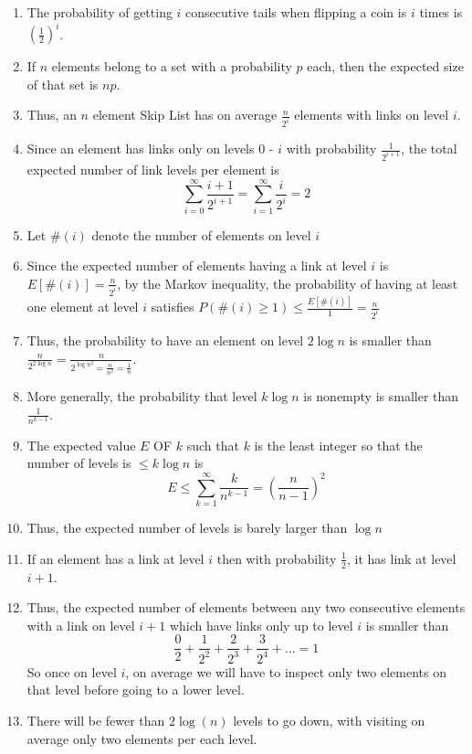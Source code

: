 \documentclass[12pt, letterpaper]{article}
\begin{document}
\begin{enumerate}
    \item The probability of getting $i$ consecutive tails when flipping a coin is $i$ times is $(\frac{1}{2})^i$.
    \item If $n$ elements belong to a set with a probability $p$ each, then the expected size of that set is $np$.
    \item Thus, an $n$ element Skip List has on average $\frac{n}{2^i}$ elements with links on level $i$.
    \item Since an element has links only on levels 0 - $i$ with probability $\frac{1}{2^{i + 1}}$, the total expected number of link levels per element is \[\sum_{i=0}^{\infty}\frac{i + 1}{2^{i + 1}} = \sum_{i=1}^{\infty}\frac{i}{2^i} = 2\]
    \item Let $\#(i)$ denote the number of elements on level $i$
    \item Since the expected number of elements having a link at level $i$ is $E[\#(i)] = \frac{n}{2^i}$, by the Markov inequality, the probability of having at least one element at level $i$ satisfies $P(\#(i)\geq 1) \leq \frac{E[\#(i)]}{1} = \frac{n}{2^i}$
    \item Thus, the probability to have an element on level $2\log n$ is smaller than $\frac{n}{2^{2\log n}} = \frac{n}{2^{\log n^2} = \frac{n}{n^2} = \frac{1}{n}}$.
    \item More generally, the probability that level $k\log n$ is nonempty is smaller than $\frac{1}{n^{k-1}}$.
    \item The expected value $E$ OF $k$ such that $k$ is the least integer so that the number of levels is $\leq k\log n$ is \[E\leq \sum_{k=1}^{\infty}\frac{k}{n^{k - 1}} = (\frac{n}{n - 1})^2\]
    \item Thus, the expected number of levels is barely larger than $\log n$
    \item If an element has a link at level $i$ then with probability $\frac{1}{2}$, it has link at level $i + 1$.
    \item Thus, the expected number of elements between any two consecutive elements with a link on level $i + 1$ which have links only up to level $i$ is smaller than \[\frac{0}{2} + \frac{1}{2^2} + \frac{2}{2^3} + \frac{3}{2^4} + \dots = 1\] So once on level $i$, on average we will have to inspect only two elements on that level before going to a lower level.
    \item There will be fewer than $2\log(n)$ levels to go down, with visiting on average only two elements per each level.

\end{enumerate}
\end{document}
